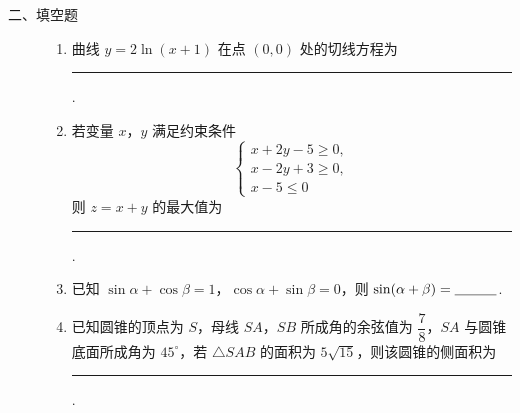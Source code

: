 \begin{description}

    \item[二、填空题]

    \begin{enumerate}[leftmargin=5pt]

      \addtocounter{enumi}{+12}

        \item 曲线 \(y=2\ln(x+1)\) 在点 \((0,0)\) 处的切线方程为\rule[-0.3ex]{3em}{0.4pt}.

        \item 若变量 \(x\)，\(y\) 满足约束条件
\[
\begin{cases}

x+2y-5\ge0,\\
x-2y+3\ge0,\\
x-5\le0

\end{cases}
\]则 \(z=x+y\) 的最大值为\rule[-0.3ex]{3em}{0.4pt}.

        \item 已知 \(\sin\alpha+\cos\beta=1\)，\(\cos\alpha+\sin\beta=0\)，则 \(\sin(\alpha+\beta)=\rule[-0.3ex]{3em}{0.4pt}\).

        \item 已知圆锥的顶点为 \(S\)，母线 \(SA\)，\(SB\) 所成角的余弦值为 \(\dfrac78\)，\(SA\) 与圆锥底面所成角为 \(45^\circ\)，若 \(\triangle SAB\) 的面积为 \(5\sqrt{15}\)，则该圆锥的侧面积为\rule[-0.3ex]{3em}{0.4pt}.

    \end{enumerate}

\end{description}

